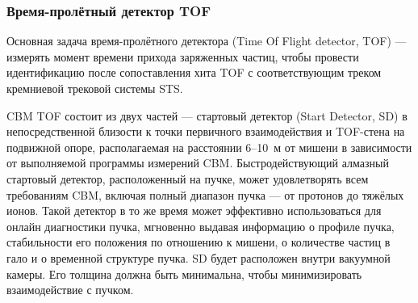 \subsubsection{Время-пролётный детектор TOF}\label{sec:secTOF}



Основная задача время-пролётного детектора (Time Of Flight detector, TOF) --- измерять момент времени прихода заряженных частиц, чтобы провести идентификацию после сопоставления хита TOF с соответствующим треком кремниевой трековой системы STS.


CBM TOF состоит из двух частей --- стартовый детектор (Start Detector, SD) в непосредственной близости к точки первичного взаимодействия и TOF-стена на подвижной опоре, располагаемая на расстоянии 6--10~м от мишени в зависимости от выполняемой программы измерений CBM. Быстродействующий алмазный стартовый детектор, расположенный на пучке, может удовлетворять всем требованиям CBM, включая полный диапазон пучка --- от протонов до тяжёлых ионов. Такой детектор в то же время может эффективно использоваться для онлайн диагностики пучка, мгновенно выдавая информацию о профиле пучка, стабильности его положения по отношению к мишени, о количестве частиц в гало и о временной структуре пучка. SD будет расположен внутри вакуумной камеры. Его толщина должна быть минимальна, чтобы минимизировать взаимодействие с пучком.


